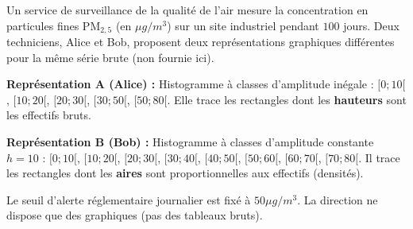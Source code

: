 \documentclass[11pt]{article}
\begin{document}
\begin{exercice}
\label{exo:graphiques}
Un service de surveillance de la qualité de l'air mesure la concentration en particules fines $\text{PM}_{2,5}$ (en $\mu g/m^3$) sur un site industriel pendant $100$ jours. Deux techniciens, Alice et Bob, proposent deux représentations graphiques différentes pour la même série brute (non fournie ici).

\textbf{Représentation A (Alice) :} Histogramme à classes d'amplitude inégale : $[0; 10[$, $[10; 20[$, $[20; 30[$, $[30; 50[$, $[50; 80[$. Elle trace les rectangles dont les \textbf{hauteurs} sont les effectifs bruts.

\textbf{Représentation B (Bob) :} Histogramme à classes d'amplitude constante $h=10$ : $[0; 10[$, $[10; 20[$, $[20; 30[$, $[30; 40[$, $[40; 50[$, $[50; 60[$, $[60; 70[$, $[70; 80[$. Il trace les rectangles dont les \textbf{aires} sont proportionnelles aux effectifs (densités).

Le seuil d'alerte réglementaire journalier est fixé à $50 \mu g/m^3$. La direction ne dispose que des graphiques (pas des tableaux bruts).


\end{exercice}
\end{document}
